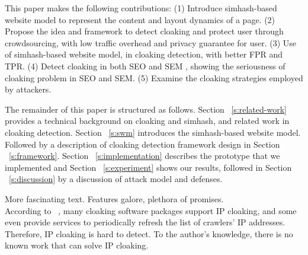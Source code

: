 This paper makes the following contributions:
(1) Introduce simhash-based website model to represent the content and layout
dynamics of a page.
(2) Propose the idea and framework to detect cloaking and protect user through crowdsourcing,
with low traffic overhead and privacy guarantee for user.
(3) Use of simhash-based website model, in cloaking detection, with better FPR
and TPR.
(4) Detect cloaking in both SEO and SEM , showing the seriousness of cloaking
problem in SEO and SEM.
(5) Examine the cloaking strategies employed by attackers.


The remainder of this paper is structured as follows. Section
~\autoref{s:related-work} provides a
technical background on cloaking and simhash, and related work in cloaking
detection. Section ~\autoref{s:swm} introduces the simhash-based website model.
Followed by a description of cloaking detection framework design in 
Section ~\autoref{s:framework}. Section ~\autoref{s:implementation} describes the 
prototype that we implemented and Section ~\autoref{s:experiment} shows our results,
followed in  Section ~\autoref{s:discussion} by a discussion of attack
model and defenses.



More fascinating text. Features galore, plethora of promises.\\


According to ~\cite{lin2009detection}, many cloaking software packages support
IP cloaking, and some even provide services to periodically refresh the list of
crawlers’ IP addresses. Therefore, IP cloaking is hard to detect. To the
author's knowledge, there is no known work that can solve IP
cloaking.


